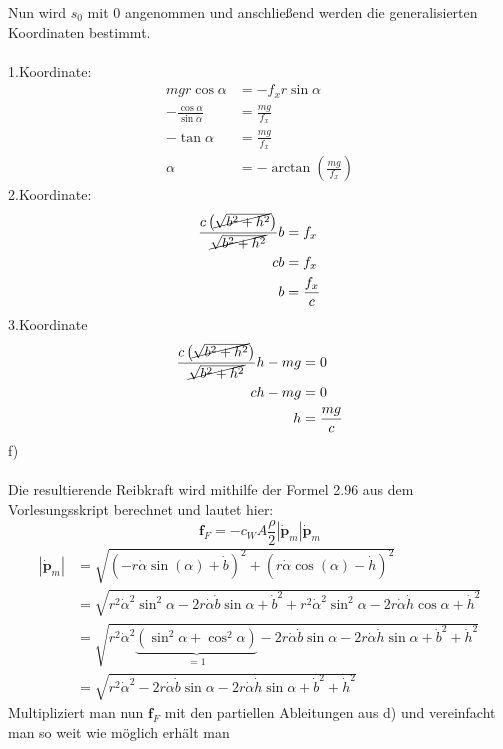 Nun wird $s_0$ mit 0 angenommen und anschließend werden die generalisierten Koordinaten bestimmt. \\ \\
1.Koordinate:
\begin{align*}
	mgr\cos\alpha &= -f_xr\sin\alpha \\
	-\frac{\cos\alpha}{\sin\alpha} &= \frac{mg}{f_x}  \\
	-\tan\alpha &= \frac{mg}{f_x} \\
	\alpha &= -\arctan\left( \frac{mg}{f_x}\right)
\end{align*}
2.Koordinate:
\begin{align*}
	\frac{c\left(\cancel{\sqrt{b^2 + h^2}}\right)}{\cancel{\sqrt{b^2 + h^2}}} b &= f_x \\
	cb &= f_x \\
	b &= \frac{f_x}{c}
\end{align*}
3.Koordinate
\begin{align*}
	\frac{c\left(\cancel{\sqrt{b^2 + h^2}}\right)}{\cancel{\sqrt{b^2 + h^2}}} h -mg &= 0 \\
	ch - mg &= 0 \\
	h &= \frac{mg}{c}
\end{align*}
f) \\ \\
Die resultierende Reibkraft wird mithilfe der Formel 2.96 aus dem Vorlesungsskript berechnet und lautet hier:
\[
	\textbf{f}_F = -c_W A \frac{\rho}{2} |\dot{\textbf{p}}_m|\dot{\textbf{p}}_m
\]
\begin{align*}
	|\dot{\textbf{p}}_m| &= \sqrt{\left( -r \dot{\alpha}
		\sin \left( \alpha 
		\right) + \dot{b}\right)^2 
	+
	\left( 	r \dot{\alpha} \cos \left( \alpha  \right) -
	\dot{h}\right)^2} \\
	&= \sqrt{r^2\dot{\alpha}^2\sin^2\alpha -2r\dot{\alpha}\dot{b}\sin\alpha + \dot{b}^2 + r^2\dot{\alpha}^2\sin^2\alpha - 2r\dot{\alpha}\dot{h}\cos\alpha + \dot{h}^2} \\
	&= \sqrt{r^2\dot{\alpha}^2\underbrace{\left(\sin^2\alpha + \cos^2\alpha\right)}_{=1} - 2r\dot{\alpha}\dot{b}\sin\alpha - 2r\dot{\alpha}\dot{h}\sin\alpha + \dot{b}^2 + \dot{h}^2} \\
	&= \sqrt{r^2\dot{\alpha}^2 - 2r\dot{\alpha}\dot{b}\sin\alpha - 2r\dot{\alpha}\dot{h}\sin\alpha + \dot{b}^2 + \dot{h}^2}
\end{align*}
Multipliziert man nun $\textbf{f}_F$ mit den partiellen Ableitungen aus d) und vereinfacht man so weit wie möglich erhält man
